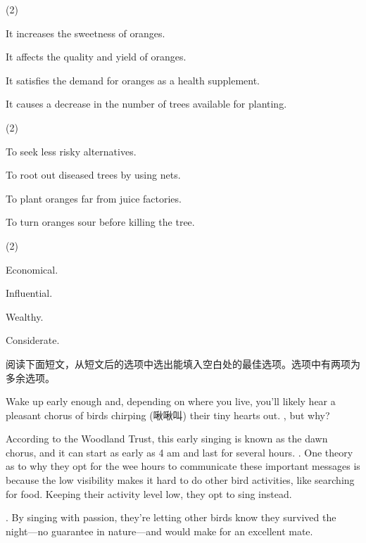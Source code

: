 \documentclass{英语试卷}
\begin{document}
\begin{choices}(2)
  \item It increases the sweetness of oranges.
  \item It affects the quality and yield of oranges.
  \item It satisfies the demand for oranges as a health supplement.
  \item It causes a decrease in the number of trees available for planting.
\end{choices}
\begin{choices}(2)
  \item To seek less risky alternatives.
  \item To root out diseased trees by using nets.
  \item To plant oranges far from juice factories.
  \item To turn oranges sour before killing the tree.
\end{choices}
\begin{choices}(2)
  \item Economical.
  \item Influential.
  \item Wealthy.
  \item Considerate.
\end{choices}
\par 阅读下面短文，从短文后的选项中选出能填入空白处的最佳选项。选项中有两项为多余选项。\par
\par Wake up early enough and, depending on where you live, you'll likely hear a pleasant chorus of birds chirping (啾啾叫) their tiny hearts out. , but why?\par
\par According to the Woodland Trust, this early singing is known as the dawn chorus, and it can start as early as 4 am and last for several hours. . One theory as to why they opt for the wee hours to communicate these important messages is because the low visibility makes it hard to do other bird activities, like searching for food. Keeping their activity level low, they opt to sing instead.\par
\par {}. By singing with passion, they're letting other birds know they survived the night—no guarantee in nature—and would make for an excellent mate.\par
\end{document}
